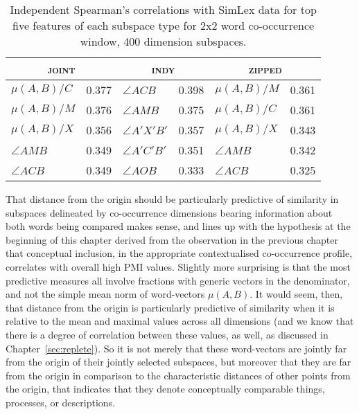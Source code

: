 \begin{table}
\centering
\begin{tabular}{lr|lr|lr}
\hline
\multicolumn{2}{c}{\textsc{joint}} & \multicolumn{2}{c}{\textsc{indy}} & \multicolumn{2}{c}{\textsc{zipped}} \\
\hline
$\mu (A,B)/C$ & 0.377 & $\angle ACB$ & 0.398 & $\mu (A,B)/M$ & 0.361 \\
$\mu (A,B)/M$ & 0.376 & $\angle AMB$ & 0.375 & $\mu (A,B)/C$ & 0.361 \\
$\mu (A,B)/X$ & 0.356 & $\angle A'X'B'$ & 0.357 & $\mu (A,B)/X$ & 0.343 \\
$\angle AMB$ & 0.349 & $\angle A'C'B'$ & 0.351 & $\angle AMB$ & 0.342 \\
$\angle ACB$ & 0.349 & $\angle AOB$ & 0.333 & $\angle ACB$ & 0.325 \\
\hline
\end{tabular}
\caption[Similarity Correlations of Individual Features]{Independent Spearman's correlations with SimLex data for top five features of each subspace type for 2x2 word co-occurrence window, 400 dimension subspaces.}
\label{tab:ind-similar}
\end{table}

That distance from the origin should be particularly predictive of similarity in subspaces delineated by co-occurrence dimensions bearing information about both words being compared makes sense, and lines up with the hypothesis at the beginning of this chapter derived from the observation in the previous chapter that conceptual inclusion, in the appropriate contextualised co-occurrence profile, correlates with overall high PMI values.  Slightly more surprising is that the most predictive measures all involve fractions with generic vectors in the denominator, and not the simple mean norm of word-vectors $\mu(A,B)$.  It would seem, then, that distance from the origin is particularly predictive of similarity when it is relative to the mean and maximal values across all dimensions (and we know that there is a degree of correlation between these values, as well, as discussed in Chapter~\ref{sec:replete}).  So it is not merely that these word-vectors are jointly far from the origin of their jointly selected subspaces, but moreover that they are far from the origin in comparison to the characteristic distances of other points from the origin, that indicates that they denote conceptually comparable things, processes, or descriptions.

